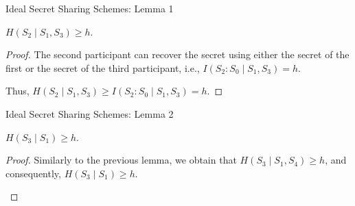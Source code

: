 \documentclass[
handout,
aspectratio=169]{beamer}
\begin{document}
\begin{frame}{Ideal Secret Sharing Schemes: Lemma 1}
    \begin{lemma}
        $H(S_2 \mid S_1, S_3) \ge h$.
    \end{lemma}

    \begin{proof}
        The second participant can recover the secret using either the secret of the first or the secret of the third participant,
        i.e., $I(S_2 : S_0 \mid S_1, S_3) = h$.
        \begin{center}
        \end{center}
        Thus, $H(S_2 \mid S_1, S_3) \ge I(S_2 : S_0 \mid S_1, S_3) = h$.
    \end{proof}
\end{frame}

\begin{frame}{Ideal Secret Sharing Schemes: Lemma 2}
    \begin{lemma}
        $H(S_3 \mid S_1) \ge h$.
    \end{lemma}

    \begin{proof}
        Similarly to the previous lemma, we obtain that $H(S_3 \mid S_1, S_4) \ge h$, and consequently,
        $H(S_3 \mid S_1) \ge h$.
        \begin{center}
        \end{center}
    \end{proof}
\end{frame}
\end{document}
